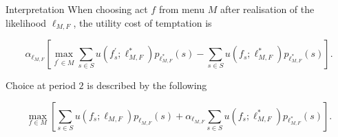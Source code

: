 \documentclass[usenames,dvipsnames,aspectratio=169,11pt, envcountsect]{beamer}
\begin{document}
\begin{frame}{Interpretation}
	When choosing act \( f \) from menu \( M \) after realisation of the likelihood \( \ell_{M, F} \), the utility cost of temptation is

	\vfill

	\[
		\alpha _{\ell_{M, F}} \left[ \max _{f^{\prime} \in M} \sum_{s \in S} u\left(f^{\prime}_{s} ; \ell^{*}_{M, F} \right) p_{\ell^{*}_{M, F}} \left( s \right) - \sum_{s \in S} u \left( f_{s} ; \ell^{*}_{M, F} \right) p_{\ell^{*}_{M, F}} \left( s \right) \right] .
	\] \pause

	\vfill


	Choice at period \( 2 \) is described by the following

	\vfill


	\[
		\max _{f \in M} \left[ \sum_{s \in S} u \left( f_{s} ; \ell_{M, F} \right) p_{\ell_{M, F}} \left( s \right) +\alpha _{\ell_{M, F}} \sum_{s \in S} u \left( f_{s} ; \ell^{*}_{M, F} \right) p_{\ell^{*}_{M, F}} \left( s \right) \right].
	\]

\end{frame}
\end{document}
